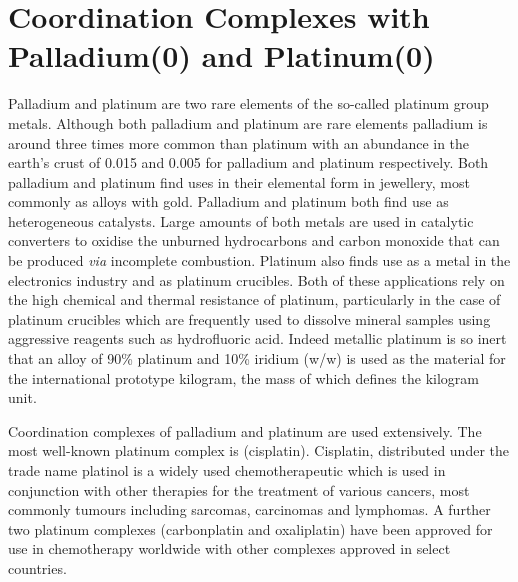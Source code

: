 
\chapter{Coordination Complexes with Palladium(0) and Platinum(0)}
\label{ch:platinum0}

Palladium and platinum are two rare elements of the so-called platinum group metals.  Although both palladium and platinum are rare elements palladium is around three times more common than platinum with an abundance in the earth's crust of 0.015 and 0.005 for palladium and platinum respectively.  Both palladium and platinum find uses in their elemental form in jewellery, most commonly as alloys with gold.  Palladium and platinum both find use as heterogeneous catalysts.  Large amounts of both metals are used in catalytic converters to oxidise the unburned hydrocarbons and carbon monoxide that can be produced \emph{via} incomplete combustion.  Platinum also finds use as a metal in the electronics industry and as platinum crucibles.  Both of these applications rely on the high chemical and thermal resistance of platinum, particularly in the case of platinum crucibles which are frequently used to dissolve mineral samples using aggressive reagents such as hydrofluoric acid.  Indeed metallic platinum is so inert that an alloy of 90\%{} platinum and 10\%{} iridium (w/w) is used as the material for the international prototype kilogram, the mass of which defines the kilogram unit.  

Coordination complexes of palladium and platinum are used extensively.  The most well-known platinum complex is \ce{[Pt(NH3)2Cl2]} (cisplatin).  Cisplatin, distributed under the trade name platinol is a widely used chemotherapeutic which is used in conjunction with other therapies for the treatment of various cancers, most commonly tumours including sarcomas, carcinomas and lymphomas.  A further two platinum complexes (carbonplatin and oxaliplatin) have been approved for use in chemotherapy worldwide with other complexes approved in select countries.\cite{Wilson2013}

